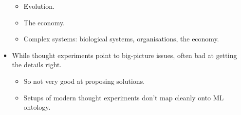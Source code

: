\begin{itemize}
\begin{itemize}
        \item Evolution.
        \item The economy.
        \item Complex systems: biological systems, organisations, the economy.
    \end{itemize}
    \item While thought experiments point to big-picture issues, often bad at getting the details right.
    \begin{itemize}
        \item So not very good at proposing solutions.
        \item Setups of modern thought experiments don't map cleanly onto ML ontology.
    \end{itemize}
\end{itemize}
